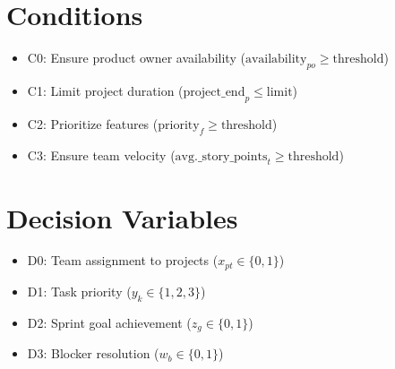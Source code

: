 \documentclass{article}
\begin{document}
\section{Conditions}
\begin{itemize}
    \item C0: Ensure product owner availability ($\text{availability}_{po} \geq \text{threshold}$)
    \item C1: Limit project duration ($\text{project\_end}_p \leq \text{limit}$)
    \item C2: Prioritize features ($\text{priority}_f \geq \text{threshold}$)
    \item C3: Ensure team velocity ($\text{avg.\_story\_points}_t \geq \text{threshold}$)
\end{itemize}

\section{Decision Variables}
\begin{itemize}
    \item D0: Team assignment to projects ($x_{pt} \in \{0,1\}$)
    \item D1: Task priority ($y_k \in \{1,2,3\}$)
    \item D2: Sprint goal achievement ($z_g \in \{0,1\}$)
    \item D3: Blocker resolution ($w_b \in \{0,1\}$)
\end{itemize}
\end{document}
